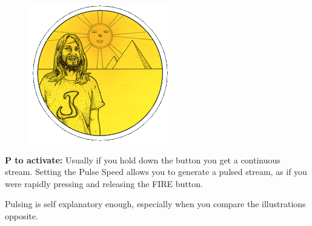 \begin{definition}
\setlength{\intextsep}{0pt}%
\setlength{\columnsep}{3pt}%
\begin{figure}
\includegraphics[width=\linewidth]{src/callout/psych.png} 
\end{figure}
\small
\textbf{P to activate:} Usually if you hold down the button
you get a continuous stream. Setting the Pulse Speed allows you to
generate a pulsed stream, as if you were rapidly pressing and
releasing the FIRE button.
\\
\end{definition}

Pulsing is self explanatory enough, especially when you compare the
illustrations opposite. 

